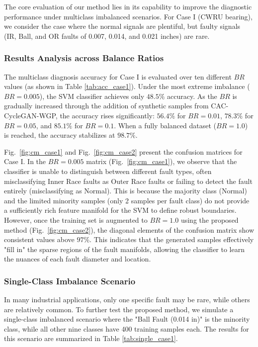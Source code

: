 The core evaluation of our method lies in its capability to improve the diagnostic performance under multiclass imbalanced scenarios. For Case I (CWRU bearing), we consider the case where the normal signals are plentiful, but faulty signals (IR, Ball, and OR faults of 0.007, 0.014, and 0.021 inches) are rare.

\subsubsection{Results Analysis across Balance Ratios}
The multiclass diagnosis accuracy for Case I is evaluated over ten different $BR$ values (as shown in Table \ref{tab:acc_case1}). Under the most extreme imbalance ($BR = 0.005$), the SVM classifier achieves only $48.5\%$ accuracy. As the $BR$ is gradually increased through the addition of synthetic samples from CAC-CycleGAN-WGP, the accuracy rises significantly: $56.4\%$ for $BR=0.01$, $78.3\%$ for $BR=0.05$, and $85.1\%$ for $BR=0.1$. When a fully balanced dataset ($BR=1.0$) is reached, the accuracy stabilizes at $98.7\%$.

Fig.~\ref{fig:cm_case1} and Fig.~\ref{fig:cm_case2} present the confusion matrices for Case I. In the $BR=0.005$ matrix (Fig.~\ref{fig:cm_case1}), we observe that the classifier is unable to distinguish between different fault types, often misclassifying Inner Race faults as Outer Race faults or failing to detect the fault entirely (misclassifying as Normal). This is because the majority class (Normal) and the limited minority samples (only 2 samples per fault class) do not provide a sufficiently rich feature manifold for the SVM to define robust boundaries. However, once the training set is augmented to $BR=1.0$ using the proposed method (Fig.~\ref{fig:cm_case2}), the diagonal elements of the confusion matrix show consistent values above $97\%$. This indicates that the generated samples effectively "fill in" the sparse regions of the fault manifolds, allowing the classifier to learn the nuances of each fault diameter and location.

\subsubsection{Single-Class Imbalance Scenario}
In many industrial applications, only one specific fault may be rare, while others are relatively common. To further test the proposed method, we simulate a single-class imbalanced scenario where the "Ball Fault (0.014 in)" is the minority class, while all other nine classes have 400 training samples each. The results for this scenario are summarized in Table \ref{tab:single_case1}.

